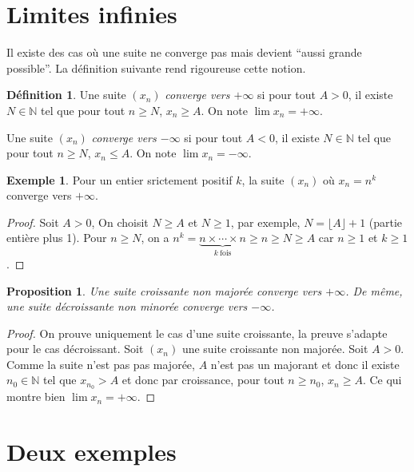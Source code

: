 \documentclass[
]{book}
\newtheorem{proposition}{Proposition}[chapter]
\theoremstyle{definition}
\newtheorem{definition}{Définition}[chapter]
\theoremstyle{definition}
\newtheorem{example}{Exemple}[chapter]
\theoremstyle{definition}
\theoremstyle{definition}
\theoremstyle{remark}
\begin{document}
\hypertarget{limites-infinies}{%
\section{Limites infinies}\label{limites-infinies}}

Il existe des cas où une suite ne converge pas mais devient ``aussi grande possible''. La définition suivante rend rigoureuse cette notion.

\begin{definition}
Une suite \((x_n)\) \emph{converge vers \(+\infty\)} si pour tout \(A>0\), il existe \(N\in\mathbb{N}\) tel que pour tout \(n\geq N\), \(x_n\geq A\). On note \(\lim x_n=+\infty\).

Une suite \((x_n)\) \emph{converge vers \(-\infty\)} si pour tout \(A<0\), il existe \(N\in\mathbb{N}\) tel que pour tout \(n\geq N\), \(x_n\leq A\). On note \(\lim x_n=-\infty\).
\end{definition}

\begin{example}
Pour un entier srictement positif \(k\), la suite \((x_n)\) où \(x_n=n^k\) converge vers \(+\infty\).
\end{example}

\begin{proof}
Soit \(A>0\), On choisit \(N\geq A\) et \(N\geq1\), par exemple, \(N=\lfloor A\rfloor+1\) (partie entière plus 1). Pour \(n\geq N\), on a \(n^k=\underbrace{n\times\cdots\times n}_{k\ \textrm{fois}}\geq n\geq N\geq A\) car \(n\geq 1\) et \(k\geq 1\).
\end{proof}

\begin{proposition}
Une suite croissante non majorée converge vers \(+\infty\). De même, une suite décroissante non minorée converge vers \(-\infty\).
\end{proposition}

\begin{proof}
On prouve uniquement le cas d'une suite croissante, la preuve s'adapte pour le cas décroissant. Soit \((x_n)\) une suite croissante non majorée. Soit \(A>0\). Comme la suite n'est pas pas majorée, \(A\) n'est pas un majorant et donc il existe \(n_0\in\mathbb{N}\) tel que \(x_{n_0}>A\) et donc par croissance, pour tout \(n\geq n_0\), \(x_n\geq A\). Ce qui montre bien \(\lim x_n=+\infty\).
\end{proof}

\hypertarget{deux-exemples}{%
\section{Deux exemples}\label{deux-exemples}}
\end{document}
